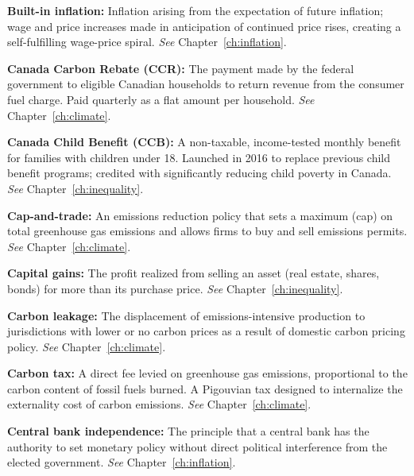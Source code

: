 \vspace{6pt}
\noindent\textbf{Built-in inflation:} Inflation arising from the expectation of future inflation; wage and price increases made in anticipation of continued price rises, creating a self-fulfilling wage-price spiral. \textit{See} Chapter~\ref{ch:inflation}.

\vspace{6pt}
\noindent\textbf{Canada Carbon Rebate (CCR):} The payment made by the federal government to eligible Canadian households to return revenue from the consumer fuel charge. Paid quarterly as a flat amount per household. \textit{See} Chapter~\ref{ch:climate}.

\vspace{6pt}
\noindent\textbf{Canada Child Benefit (CCB):} A non-taxable, income-tested monthly benefit for families with children under 18. Launched in 2016 to replace previous child benefit programs; credited with significantly reducing child poverty in Canada. \textit{See} Chapter~\ref{ch:inequality}.

\vspace{6pt}
\noindent\textbf{Cap-and-trade:} An emissions reduction policy that sets a maximum (cap) on total greenhouse gas emissions and allows firms to buy and sell emissions permits. \textit{See} Chapter~\ref{ch:climate}.

\vspace{6pt}
\noindent\textbf{Capital gains:} The profit realized from selling an asset (real estate, shares, bonds) for more than its purchase price. \textit{See} Chapter~\ref{ch:inequality}.

\vspace{6pt}
\noindent\textbf{Carbon leakage:} The displacement of emissions-intensive production to jurisdictions with lower or no carbon prices as a result of domestic carbon pricing policy. \textit{See} Chapter~\ref{ch:climate}.

\vspace{6pt}
\noindent\textbf{Carbon tax:} A direct fee levied on greenhouse gas emissions, proportional to the carbon content of fossil fuels burned. A Pigouvian tax designed to internalize the externality cost of carbon emissions. \textit{See} Chapter~\ref{ch:climate}.

\vspace{6pt}
\noindent\textbf{Central bank independence:} The principle that a central bank has the authority to set monetary policy without direct political interference from the elected government. \textit{See} Chapter~\ref{ch:inflation}.

